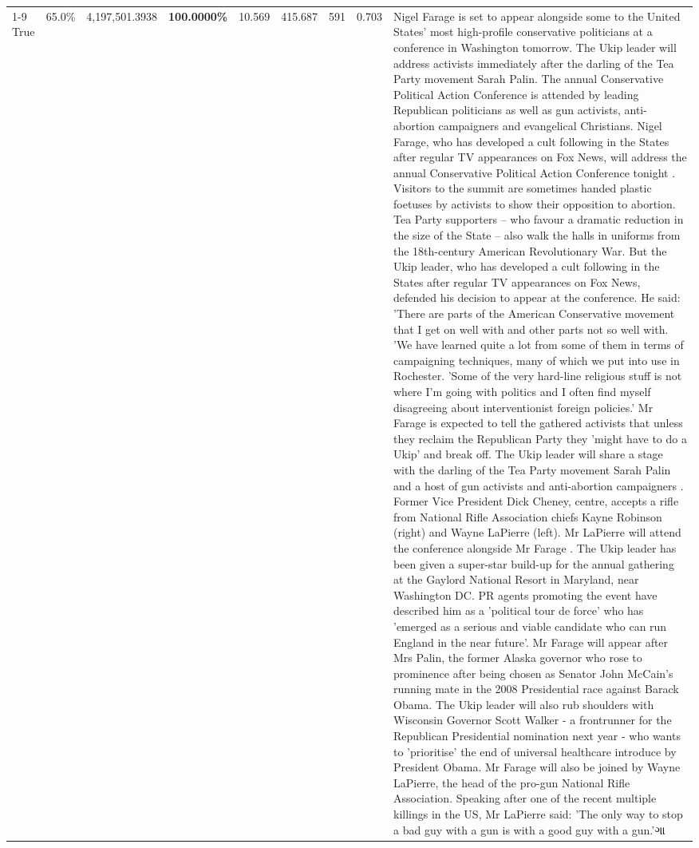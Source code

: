 \begin{table}[H]
\begin{tabular}{lllrlllll}
\cline{1-9}
True & 65.0\% & 4,197,501.3938 & \bfseries \color{red} 100.0000\% & 10.569 & 415.687 & 591 & 0.703 & Nigel Farage is set to appear alongside some to the United States' most high-profile conservative politicians at a conference in Washington tomorrow. The Ukip leader will address activists immediately after the darling of the Tea Party movement Sarah Palin. The annual Conservative Political Action Conference is attended by leading Republican politicians as well as gun activists, anti-abortion campaigners and evangelical Christians. Nigel Farage, who has developed a cult following in the States after regular TV appearances on Fox News, will address the annual Conservative Political Action Conference tonight . Visitors to the summit are sometimes handed plastic foetuses by activists to show their opposition to abortion. Tea Party supporters – who favour a dramatic reduction in the size of the State – also walk the halls in uniforms from the 18th-century American Revolutionary War. But the Ukip leader, who has developed a cult following in the States after regular TV appearances on Fox News, defended his decision to appear at the conference. He said: 'There are parts of the American Conservative movement that I get on well with and other parts not so well with. 'We have learned quite a lot from some of them in terms of campaigning techniques, many of which we put into use in Rochester. 'Some of the very hard-line religious stuff is not where I'm going with politics and I often find myself disagreeing about interventionist foreign policies.' Mr Farage is expected to tell the gathered activists that unless they reclaim the Republican Party they 'might have to do a Ukip' and break off. The Ukip leader will share a stage with the darling of the Tea Party movement Sarah Palin and a host of gun activists and anti-abortion campaigners . Former Vice President Dick Cheney, centre, accepts a rifle from National Rifle Association chiefs Kayne Robinson (right) and Wayne LaPierre (left). Mr LaPierre will attend the conference alongside Mr Farage . The Ukip leader has been given a super-star build-up for the annual gathering at the Gaylord National Resort in Maryland, near Washington DC. PR agents promoting the event have described him as a 'political tour de force' who has 'emerged as a serious and viable candidate who can run England in the near future'. Mr Farage will appear after Mrs Palin, the former Alaska governor who rose to prominence after being chosen as Senator John McCain's running mate in the 2008 Presidential race against Barack Obama. The Ukip leader will also rub shoulders with Wisconsin Governor Scott Walker - a frontrunner for the Republican Presidential nomination next year - who wants to 'prioritise' the end of universal healthcare introduce by President Obama. Mr Farage will also be joined by Wayne LaPierre, the head of the pro-gun National Rifle Association. Speaking after one of the recent multiple killings in the US, Mr LaPierre said: 'The only way to stop a bad guy with a gun is with a good guy with a gun.'ગા \\

\end{tabular}
\end{table}
